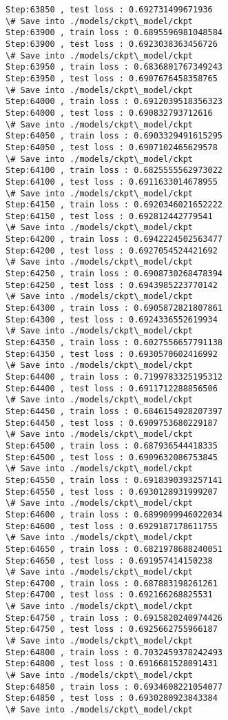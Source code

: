 \documentclass[11pt]{article}
\begin{document}
\begin{Verbatim}[commandchars=\\\{\}]
Step:63850 , test loss : 0.692731499671936
\# Save into ./models/ckpt\_model/ckpt
Step:63900 , train loss : 0.6895596981048584
Step:63900 , test loss : 0.6923038363456726
\# Save into ./models/ckpt\_model/ckpt
Step:63950 , train loss : 0.6836801767349243
Step:63950 , test loss : 0.6907676458358765
\# Save into ./models/ckpt\_model/ckpt
Step:64000 , train loss : 0.6912039518356323
Step:64000 , test loss : 0.690832793712616
\# Save into ./models/ckpt\_model/ckpt
Step:64050 , train loss : 0.6903329491615295
Step:64050 , test loss : 0.6907102465629578
\# Save into ./models/ckpt\_model/ckpt
Step:64100 , train loss : 0.6825555562973022
Step:64100 , test loss : 0.6911633014678955
\# Save into ./models/ckpt\_model/ckpt
Step:64150 , train loss : 0.6920346021652222
Step:64150 , test loss : 0.692812442779541
\# Save into ./models/ckpt\_model/ckpt
Step:64200 , train loss : 0.6942224502563477
Step:64200 , test loss : 0.6927054524421692
\# Save into ./models/ckpt\_model/ckpt
Step:64250 , train loss : 0.6908730268478394
Step:64250 , test loss : 0.6943985223770142
\# Save into ./models/ckpt\_model/ckpt
Step:64300 , train loss : 0.6905872821807861
Step:64300 , test loss : 0.6924336552619934
\# Save into ./models/ckpt\_model/ckpt
Step:64350 , train loss : 0.6027556657791138
Step:64350 , test loss : 0.6930570602416992
\# Save into ./models/ckpt\_model/ckpt
Step:64400 , train loss : 0.7199783325195312
Step:64400 , test loss : 0.6911712288856506
\# Save into ./models/ckpt\_model/ckpt
Step:64450 , train loss : 0.6846154928207397
Step:64450 , test loss : 0.6909753680229187
\# Save into ./models/ckpt\_model/ckpt
Step:64500 , train loss : 0.687936544418335
Step:64500 , test loss : 0.6909632086753845
\# Save into ./models/ckpt\_model/ckpt
Step:64550 , train loss : 0.6918390393257141
Step:64550 , test loss : 0.6930128931999207
\# Save into ./models/ckpt\_model/ckpt
Step:64600 , train loss : 0.6899099946022034
Step:64600 , test loss : 0.6929187178611755
\# Save into ./models/ckpt\_model/ckpt
Step:64650 , train loss : 0.6821978688240051
Step:64650 , test loss : 0.691957414150238
\# Save into ./models/ckpt\_model/ckpt
Step:64700 , train loss : 0.687883198261261
Step:64700 , test loss : 0.692166268825531
\# Save into ./models/ckpt\_model/ckpt
Step:64750 , train loss : 0.6915820240974426
Step:64750 , test loss : 0.6925662755966187
\# Save into ./models/ckpt\_model/ckpt
Step:64800 , train loss : 0.7032459378242493
Step:64800 , test loss : 0.6916681528091431
\# Save into ./models/ckpt\_model/ckpt
Step:64850 , train loss : 0.6934608221054077
Step:64850 , test loss : 0.6930280923843384
\# Save into ./models/ckpt\_model/ckpt

\end{Verbatim}
\end{document}
